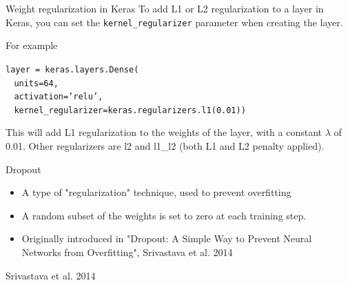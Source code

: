 \documentclass[9pt, aspectratio=169]{beamer}
\begin{document}
\begin{frame}
    {Weight regularization in Keras}
    To add L1 or L2 regularization to a layer in Keras, you can set the \texttt{kernel\_regularizer} parameter when creating the layer.

    For example

    \begin{codebox}
        \texttt{layer = keras.layers.Dense(\\
            $~~~~$units=64,\\
            $~~~~$activation='relu',\\
            $~~~~$kernel\_regularizer=keras.regularizers.l1(0.01))
        }
    \end{codebox}

    This will add L1 regularization to the weights of the layer, with a constant $\lambda$ of 0.01.
    Other regularizers are l2 and l1\_l2 (both L1 and L2 penalty applied).
\end{frame}

\begin{frame}
    {Dropout}
    \begin{itemize}
        \item A type of "regularization" technique, used to prevent overfitting
        \item A random subset of the weights is set to zero at each training step.
        \item Originally introduced in "Dropout: A Simple Way to Prevent Neural Networks from Overfitting", Srivastava et al. 2014
    \end{itemize}

    \centering

    \footnotesize
    \raggedright
    Srivastava et al. 2014
\end{frame}
\end{document}

